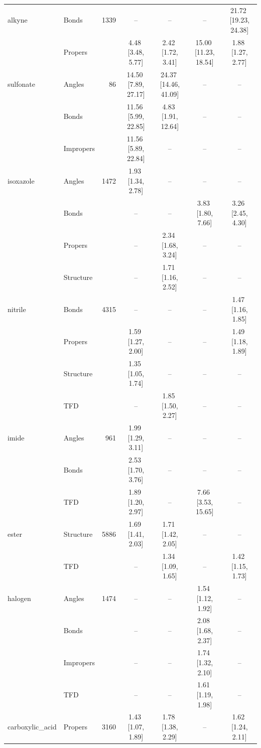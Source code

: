 \begin{longtable}[c]{ ll | r | c c c c}
    \hline
    alkyne & Bonds & 1339 & -- & -- & -- & 21.72\,\,[19.23, 24.38] \\
     & Propers &  & 4.48\,\,[3.48, 5.77] & 2.42\,\,[1.72, 3.41] & 15.00\,\,[11.23, 18.54] & 1.88\,\,[1.27, 2.77] \\
    \hline
    sulfonate & Angles & 86 & 14.50\,\,[7.89, 27.17] & 24.37\,\,[14.46, 41.09] & -- & -- \\
     & Bonds &  & 11.56\,\,[5.99, 22.85] & 4.83\,\,[1.91, 12.64] & -- & -- \\
     & Impropers &  & 11.56\,\,[5.89, 22.84] & -- & -- & -- \\
    \hline
    isoxazole & Angles & 1472 & 1.93\,\,[1.34, 2.78] & -- & -- & -- \\
     & Bonds &  & -- & -- & 3.83\,\,[1.80, 7.66] & 3.26\,\,[2.45, 4.30] \\
     & Propers &  & -- & 2.34\,\,[1.68, 3.24] & -- & -- \\
     & Structure &  & -- & 1.71\,\,[1.16, 2.52] & -- & -- \\
    \hline
    nitrile & Bonds & 4315 & -- & -- & -- & 1.47\,\,[1.16, 1.85] \\
     & Propers &  & 1.59\,\,[1.27, 2.00] & -- & -- & 1.49\,\,[1.18, 1.89] \\
     & Structure &  & 1.35\,\,[1.05, 1.74] & -- & -- & -- \\
     & TFD &  & -- & 1.85\,\,[1.50, 2.27] & -- & -- \\
    \hline
    imide & Angles & 961 & 1.99\,\,[1.29, 3.11] & -- & -- & -- \\
     & Bonds &  & 2.53\,\,[1.70, 3.76] & -- & -- & -- \\
     & TFD &  & 1.89\,\,[1.20, 2.97] & -- & 7.66\,\,[3.53, 15.65] & -- \\
    \hline
    ester & Structure & 5886 & 1.69\,\,[1.41, 2.03] & 1.71\,\,[1.42, 2.05] & -- & -- \\
     & TFD &  & -- & 1.34\,\,[1.09, 1.65] & -- & 1.42\,\,[1.15, 1.73] \\
    \hline
    halogen & Angles & 1474 & -- & -- & 1.54\,\,[1.12, 1.92] & -- \\
     & Bonds &  & -- & -- & 2.08\,\,[1.68, 2.37] & -- \\
     & Impropers &  & -- & -- & 1.74\,\,[1.32, 2.10] & -- \\
     & TFD &  & -- & -- & 1.61\,\,[1.19, 1.98] & -- \\
    \hline
    carboxylic\_acid & Propers & 3160 & 1.43\,\,[1.07, 1.89] & 1.78\,\,[1.38, 2.29] & -- & 1.62\,\,[1.24, 2.11] \\

\end{longtable}

